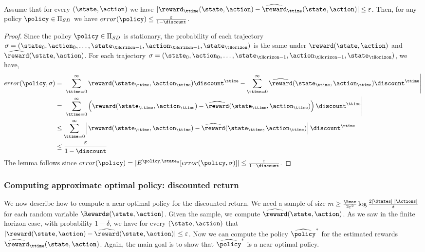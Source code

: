 \begin{lemma}
\label{lemma:approx-disc-error}
%
Assume that for every $(\state,\action)$ we have
$|\reward_\ttime(\state,\action)-\widehat{\reward}_\ttime(\state,\action)|\leq
\varepsilon$. Then, for any policy $\policy\in {\Pi _{SD}}$ we have
$error(\policy)\leq \frac{\varepsilon}{1-\discount}$.
\end{lemma}

\begin{proof}
Since the policy $\policy\in {\Pi _{SD}}$ is stationary, the
probability of each trajectory $\sigma=(\state_0,\action_0,\ldots,
\state_{\tHorizon-1},\action_{\tHorizon-1},\state_\tHorizon)$ is the
same under $\reward(\state,\action)$ and
$\widehat{\reward}(\state,\action)$. For each trajectory
$\sigma=(\state_0,\action_0,\ldots,
\state_{\tHorizon-1},\action_{\tHorizon-1},\state_\tHorizon)$, we
have,
\begin{align*}
error(\policy,\sigma)&=\left|\sum_{\ttime=0}^\infty
\reward(\state_\ttime,\action_\ttime)\discount^\ttime
-\sum_{\ttime=0}^\infty
\widehat{\reward}(\state_\ttime,\action_\ttime)\discount^\ttime \right| \\
&= \left|\sum_{\ttime=0}^\infty \left(\reward(\state_\ttime,\action_\ttime)-\widehat{\reward}(\state_\ttime,\action_\ttime)\right)\discount^\ttime \right|\\
&\leq \sum_{\ttime=0}^\infty \left|\reward(\state_\ttime,\action_\ttime)-\widehat{\reward}(\state_\ttime,\action_\ttime)\right|\discount^\ttime \\
&\leq \frac{\varepsilon}{1-\discount}
\end{align*}
The lemma follows since
$error(\policy)=|E^{\policy,\state_0}[error(\policy,\sigma)]|\leq
\frac{\varepsilon}{1-\discount}$.
\end{proof}

\subsubsection{Computing approximate optimal policy: discounted return}

We now describe how to compute a near optimal policy for the
discounted return.
We need a sample of size $m\geq \frac{\Rmax}{2\varepsilon^2}\log
\frac{2|\States|\;|\Actions|}{\delta}$ for each random variable
$\Rewards(\state,\action)$. Given the sample, we compute
$\widehat{\reward}(\state,\action)$. As we saw in the finite horizon
case, with probability $1-\delta$, we have for every
$(\state,\action)$ that
$|\reward(\state,\action)-\widehat{\reward}(\state,\action)|\leq
\varepsilon$. Now we can compute the policy $\widehat{\policy}^*$
for the estimated rewards
$\widehat{\reward}_\ttime(\state,\action)$. Again, the main goal is
to show that $\widehat{\policy}^*$ is a near optimal policy.

